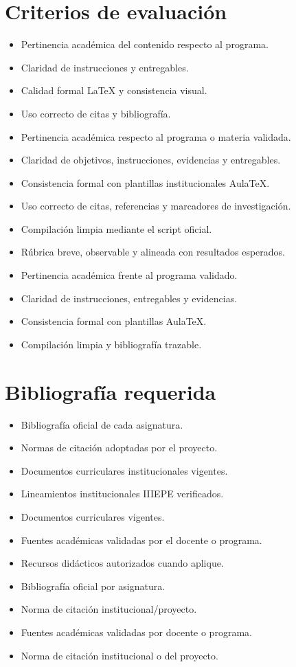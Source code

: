 \documentclass[12pt]{article}
\begin{document}
\section*{Criterios de evaluación}
\begin{itemize}[leftmargin=*]
  \item Pertinencia académica del contenido respecto al programa.
  \item Claridad de instrucciones y entregables.
  \item Calidad formal LaTeX y consistencia visual.
  \item Uso correcto de citas y bibliografía.
  \item Pertinencia académica respecto al programa o materia validada.
  \item Claridad de objetivos, instrucciones, evidencias y entregables.
  \item Consistencia formal con plantillas institucionales AulaTeX.
  \item Uso correcto de citas, referencias y marcadores de investigación.
  \item Compilación limpia mediante el script oficial.
  \item Rúbrica breve, observable y alineada con resultados esperados.
  \item Pertinencia académica frente al programa validado.
  \item Claridad de instrucciones, entregables y evidencias.
  \item Consistencia formal con plantillas AulaTeX.
  \item Compilación limpia y bibliografía trazable.
\end{itemize}

\section*{Bibliografía requerida}
\begin{itemize}[leftmargin=*]
  \item Bibliografía oficial de cada asignatura.
  \item Normas de citación adoptadas por el proyecto.
  \item Documentos curriculares institucionales vigentes.
  \item Lineamientos institucionales IIIEPE verificados.
  \item Documentos curriculares vigentes.
  \item Fuentes académicas validadas por el docente o programa.
  \item Recursos didácticos autorizados cuando aplique.
  \item Bibliografía oficial por asignatura.
  \item Norma de citación institucional/proyecto.
  \item Fuentes académicas validadas por docente o programa.
  \item Norma de citación institucional o del proyecto.
\end{itemize}
\end{document}
